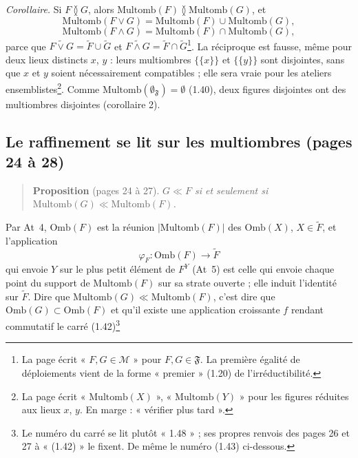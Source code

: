 \documentclass[11pt,a4paper]{article}
\begin{document}
\emph{Corollaire.} Si $F \between G$, alors $\mathrm{Multomb}(F) \between
\mathrm{Multomb}(G)$, et
\[
\mathrm{Multomb}(F \vee G) = \mathrm{Multomb}(F) \cup \mathrm{Multomb}(G),
\]
\[
\mathrm{Multomb}(F \wedge G) = \mathrm{Multomb}(F) \cap \mathrm{Multomb}(G),
\]
parce que $\widetilde{F \vee G} = \widetilde{F} \cup \widetilde{G}$ et
$\widetilde{F \wedge G} = \widetilde{F} \cap \widetilde{G}$\footnote{La page
écrit « $F, G \in \mathcal{M}$ » pour $F, G \in \mathfrak{F}$. La première
égalité de déploiements vient de la forme « premier » (1.20) de
l'irréductibilité.}. La réciproque est fausse, même pour deux lieux distincts
$x$, $y$ : leurs multiombres $\lbrace \lbrace x \rbrace \rbrace$ et $\lbrace
\lbrace y \rbrace \rbrace$ sont disjointes, sans que $x$ et $y$ soient
nécessairement compatibles ; elle sera vraie pour les ateliers
ensemblistes\footnote{La page écrit « $\mathrm{Multomb}(X)$ »,
« $\mathrm{Multomb}(Y)$ » pour les figures réduites aux lieux $x$, $y$. En marge :
« vérifier plus tard ».}. Comme $\mathrm{Multomb}(\emptyset_{\mathfrak{F}}) =
\emptyset$ (1.40), deux figures disjointes ont des multiombres disjointes
(corollaire 2).

\subsection*{Le raffinement se lit sur les multiombres (pages 24 à 28)}

\begin{quote}
\textbf{Proposition} (pages 24 à 27). \emph{$G \ll F$ si et seulement si
$\mathrm{Multomb}(G) \ll \mathrm{Multomb}(F)$.}
\end{quote}

Par At~4, $\mathrm{Omb}(F)$ est la réunion $|\mathrm{Multomb}(F)|$ des
$\mathrm{Omb}(X)$, $X \in \widetilde{F}$, et l'application
\[
\varphi_{F} : \mathrm{Omb}(F) \longrightarrow \widetilde{F}
\]
qui envoie $Y$ sur le plus petit élément de $F^{Y}$ (At~5) est celle qui envoie
chaque point du support de $\mathrm{Multomb}(F)$ sur sa strate ouverte ; elle
induit l'identité sur $\widetilde{F}$. Dire que $\mathrm{Multomb}(G) \ll
\mathrm{Multomb}(F)$, c'est dire que $\mathrm{Omb}(G) \subset \mathrm{Omb}(F)$
et qu'il existe une application croissante $f$ rendant commutatif le carré
(1.42)\footnote{Le numéro du carré se lit plutôt « 1.48 » ; ses propres renvois
des pages 26 et 27 à « (1.42) » le fixent. De même le numéro (1.43) ci-dessous.}

\end{document}
